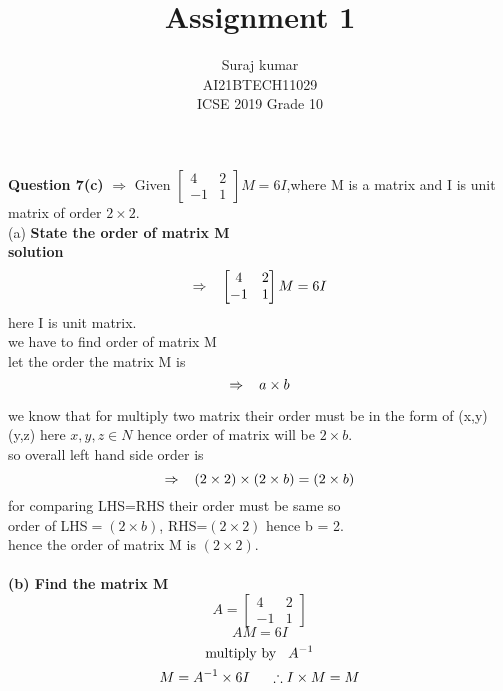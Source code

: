 \documentclass[journal,12pt,twocolumn]{IEEEtran}
\title{Assignment 1}
\author{Suraj kumar \\ \normalsize AI21BTECH11029\\\vspace*{20pt} \Large ICSE 2019 Grade 10}
\begin{document}
\maketitle
\textbf{Question 7(c)} $\Rightarrow$ Given $\begin{bmatrix}
     4 & 2 \\
     -1 & 1 
      \end{bmatrix}M=6I$,where M is a matrix and I is unit matrix of order $2\times 2.$\\
(a)  \textbf{State the order of matrix M}\\
 \textbf{solution} $$\Rightarrow  \hspace{3mm} \begin{bmatrix}
     4 & 2 \\
     -1 & 1 
      \end{bmatrix}M=6I$$  
    here I is unit matrix.\\
    we have to find order of matrix M\\
    let the order the matrix M is  $$ \Rightarrow \hspace{3mm} a\times b$$
      
      we know that for multiply two matrix their order must be in the form of  (x,y) (y,z)  here $x,y,z \in N$
      hence order of matrix will be $2\times b$.\\
      so overall left hand side order is  $$\Rightarrow \hspace{3mm} (2\times 2)\times(2\times b) =(2\times b)$$
      for comparing LHS=RHS their order must be same so \\
      order of LHS$=(2\times b)$,
      RHS=$(2\times 2)$  hence b = 2.\\
      hence the order of matrix M is $(2\times 2).$\\\\

\textbf{(b)  Find the matrix M}\\
\begin{equation}
    A=\begin{bmatrix}
      4 & 2\\
    -1 & 1
     \end{bmatrix}
     \end{equation}
     \begin{equation}
       AM=6I
     \end{equation}
    \begin{equation}
    \text{multiply by}\hspace{3mm} A^{-1}
    \end{equation}
    \begin{equation}
    M=A^{-1}\times 6I \hspace{5mm} \therefore I\times M=M
    \end{equation}     
   
\end{document}
